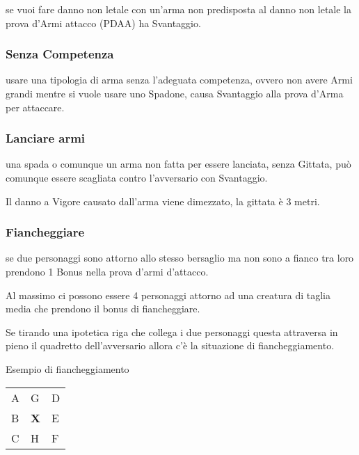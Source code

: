 \documentclass[12pt,a4paper,twoside,openany]{book}
\begin{document}
\begin{multicols}{2}
se vuoi fare danno non letale con un'arma non predisposta al danno non letale la prova d'Armi attacco (PDAA) ha Svantaggio.

\subsubsection{Senza Competenza}\label{senzacompetenza}

usare una tipologia di arma senza l'adeguata competenza, ovvero non avere Armi grandi mentre si vuole usare uno Spadone, causa Svantaggio alla prova d'Arma per attaccare.

\subsubsection{Lanciare armi} \label{lanciarearmi}

una spada o comunque un arma non fatta per essere lanciata, senza Gittata, può comunque essere scagliata contro l'avversario con Svantaggio.

Il danno a Vigore causato dall'arma viene dimezzato, la gittata è 3 metri.

\subsubsection{Fiancheggiare} \label{fiancheggiare}

se due personaggi sono attorno allo stesso bersaglio ma non sono a fianco tra loro prendono 1 Bonus nella prova d'armi d'attacco.

Al massimo ci possono essere 4 personaggi attorno ad una creatura di taglia media che prendono il bonus di fiancheggiare.

Se tirando una ipotetica riga che collega i due personaggi questa attraversa in pieno il quadretto dell'avversario allora c'è la situazione di fiancheggiamento.

\bigskip

Esempio di fiancheggiamento

\medskip

\begin{tabularx}{0.45\textwidth}{lll}
\toprule
A &  G &  D\\
B & \textbf{X}  &  E\\
C &  H &  F\\
\end{tabularx}

\bigskip


\end{multicols}
\end{document}
